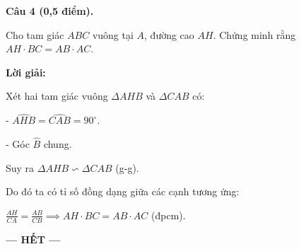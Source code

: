 \documentclass[12pt,a4paper]{article}
\begin{document}
\vspace{3mm}
\noindent\textbf{Câu 4 (0,5 điểm).}

Cho tam giác $ABC$ vuông tại $A$, đường cao $AH$. Chứng minh rằng $AH \cdot BC = AB \cdot AC$.

\noindent\textbf{Lời giải:}

Xét hai tam giác vuông $\Delta AHB$ và $\Delta CAB$ có:\par - $\widehat{AHB} = \widehat{CAB} = 90^\circ$.\par - Góc $\widehat{B}$ chung.\par Suy ra $\Delta AHB \backsim \Delta CAB$ (g-g).\par Do đó ta có tỉ số đồng dạng giữa các cạnh tương ứng:\par $\frac{AH}{CA} = \frac{AB}{CB} \implies AH \cdot BC = AB \cdot AC$ (đpcm).

\vspace{3mm}

\vfill
\begin{center}
  \textbf{--- HẾT ---}
\end{center}
\end{document}
